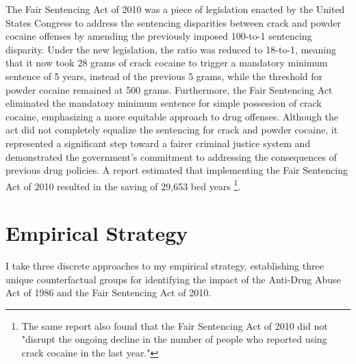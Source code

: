 \documentclass{article}
\begin{document}
The Fair Sentencing Act of 2010 was a piece of legislation enacted by the United States Congress to address the sentencing disparities between crack and powder cocaine offenses by amending the previously imposed 100-to-1 sentencing disparity. Under the new legislation, the ratio was reduced to 18-to-1, meaning that it now took 28 grams of crack cocaine to trigger a mandatory minimum sentence of 5 years, instead of the previous 5 grams, while the threshold for powder cocaine remained at 500 grams. Furthermore, the Fair Sentencing Act eliminated the mandatory minimum sentence for simple possession of crack cocaine, emphasizing a more equitable approach to drug offenses. Although the act did not completely equalize the sentencing for crack and powder cocaine, it represented a significant step toward a fairer criminal justice system and demonstrated the government's commitment to addressing the consequences of previous drug policies. A \cite{ussc} report estimated that implementing the Fair Sentencing Act of 2010 resulted in the saving of 29,653 bed years \footnote{The same \cite{ussc} report also found that the Fair Sentencing Act of 2010 did not "disrupt the ongoing decline in the number of people who reported using crack cocaine in the last year."}. 


\section{Empirical Strategy}

I take three discrete approaches to my empirical strategy, establishing three unique counterfactual groups for identifying the impact of the Anti-Drug Abuse Act of 1986 and the Fair Sentencing Act of 2010. 
\end{document}
